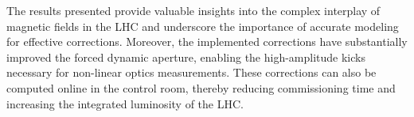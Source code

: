 The results presented provide valuable insights into the complex interplay of magnetic fields in the
LHC and underscore the importance of accurate modeling for effective corrections. Moreover, the
implemented corrections have substantially improved the forced dynamic aperture, enabling the
high-amplitude kicks necessary for non-linear optics measurements. These corrections can also be
computed online in the control room, thereby reducing commissioning time and increasing the
integrated luminosity of the LHC.